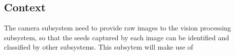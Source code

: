 \subsection{Context}

The camera subsystem need to provide raw images to the vision processing subsystem, so that the seeds captured by each image can be identified and classified by other subsystems. This subsytem will make use of 
